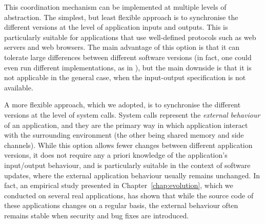 This coordination mechanism can be implemented at multiple levels of
abstraction. The simplest, but least flexible approach is to synchronise the
different versions at the level of application inputs and outputs. This is
particularly suitable for applications that use well-defined protocols such as
web servers and web browsers. The main advantage of this option is that it can
tolerate large differences between different software versions (in fact, one
could even run different implementations, as in \cite{cocktail}), but the main
downside is that it is not applicable in the general case, when the
input-output specification is not available.

A more flexible approach, which we adopted, is to synchronise the different
versions at the level of system calls.  System calls represent the
\emph{external behaviour} of an application, and they are the primary way in
which application interact with the surrounding environment (the other being
shared memory and side channels). While this option allows fewer changes
between different application versions, it does not require any a priori
knowledge of the application's input/output behaviour, and is particularly
suitable in the context of software updates, where the external application
behaviour usually remains unchanged.  In fact, an empirical study presented in
Chapter~\ref{chap:evolution}, which we conducted on several real applications,
has shown that while the source code of these applications changes on a
regular basis, the external behaviour often remains stable when security and
bug fixes are introduced.





